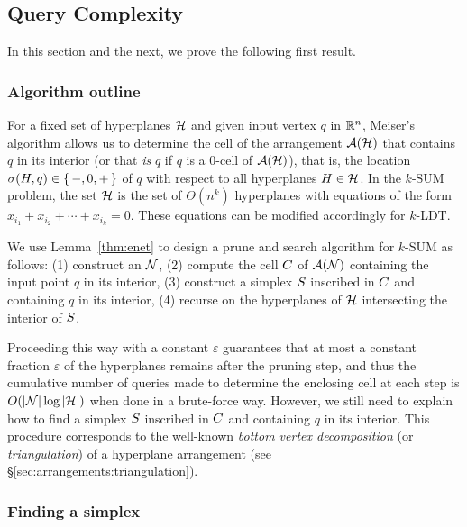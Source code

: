 \subsection{Query Complexity}%
\label{paper:ksum-algorithm:contrib:query-complexity}

In this section and the next, we prove the following first result.
\restate{\TheoremKSUMCube*}

\subsubsection{Algorithm outline}
For a fixed set of hyperplanes \(\mathcal{H}\) and given input vertex \(q\) in \(\mathbb{R}^n\),
Meiser's algorithm allows us to determine the cell of the arrangement
$\mathcal{A}(\mathcal{H})$ that contains $q$ in its interior (or that \emph{is} $q$ if
$q$ is a $0$-cell of $\mathcal{A}(\mathcal{H})$), that is, the location $\sigma(H,q) \in
\left\{\,{-, 0, +}\,\right\}$ of \(q\) with respect to all hyperplanes $H \in \mathcal{H}$. In the \(k\)-SUM
problem, the set $\mathcal{H}$ is the set of $\Theta(n^k)$ hyperplanes with equations of the
form $x_{i_1} + x_{i_2} + \cdots + x_{i_k} = 0$.
These equations can be modified accordingly for \(k\)-LDT.

We use Lemma~\ref{thm:enet} to design a prune and search algorithm for
\(k\)-SUM as follows:
(1) construct an \enet{} \(\mathcal{N}\),
(2) compute the cell \(C\) of \(\mathcal{A}(\mathcal{N})\) containing the input
point $q$ in its interior,
(3) construct a simplex \(S\) inscribed in \(C\) and containing
\(q\) in its interior,
(4) recurse on the hyperplanes of \(\mathcal{H}\) intersecting the interior of
\(S\).

Proceeding this way with a constant $\varepsilon$ guarantees that at most a
constant fraction \(\varepsilon\) of the hyperplanes remains after the pruning step,
and thus the cumulative number of queries made to determine the enclosing cell at
each step is $O(|\mathcal{N}| \log |{\mathcal{H}}|)$ when done in a brute-force way.
However, we still need to explain how to find a simplex \(S\) inscribed
in \(C\) and containing \(q\) in its interior.
%
This procedure corresponds to the well-known
\emph{bottom vertex decomposition} (or \emph{triangulation}) of a hyperplane
arrangement (see \S\ref{sec:arrangements:triangulation}).

\subsubsection{Finding a simplex}

